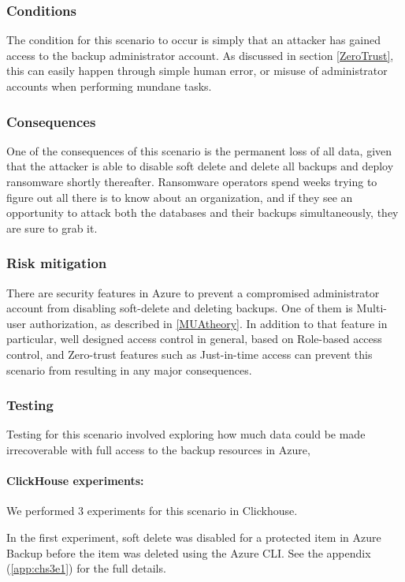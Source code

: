 \subsubsection{Conditions}

The condition for this scenario to occur is simply that an attacker has gained access to the backup administrator account. As discussed in section \ref{ZeroTrust}, this can easily happen through simple human error, or misuse of administrator accounts when performing mundane tasks.

\subsubsection{Consequences}
One of the consequences of this scenario is the permanent loss of all data, given that the attacker is able to disable soft delete and delete all backups and deploy ransomware shortly thereafter. Ransomware operators spend weeks trying to figure out all there is to know about an organization, and if they see an opportunity to attack both the databases and their backups simultaneously, they are sure to grab it. 

\subsubsection{Risk mitigation}
There are security features in Azure to prevent a compromised administrator account from disabling soft-delete and deleting backups. One of them is Multi-user authorization, as described in \ref{MUAtheory}. In addition to that feature in particular, well designed access control in general, based on Role-based access control, and Zero-trust features such as Just-in-time access can prevent this scenario from resulting in any major consequences.
 
\subsubsection{Testing}
Testing for this scenario involved exploring how much data could be made irrecoverable with full access to the backup resources in Azure, 

\paragraph{ClickHouse experiments:}

We performed 3 experiments for this scenario in Clickhouse.

In the first experiment, 
soft delete was disabled for a protected item in Azure Backup before the item was deleted using the Azure CLI.
See the appendix (\ref{app:chs3e1}) for the full details.

